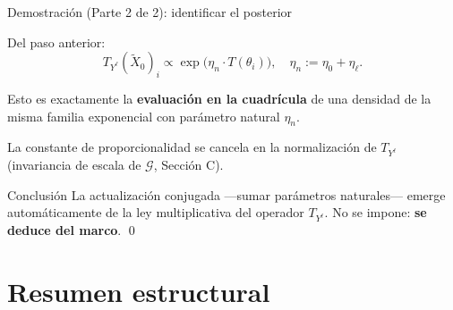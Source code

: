 \documentclass[12pt, aspectratio=169]{beamer}
\begin{document}
\begin{frame}{Demostración (Parte 2 de 2): identificar el posterior}

  Del paso anterior:
  \[
    T_{Y^\ell}(\widetilde X_0)_i
    \propto \exp\bigl(\eta_n \cdot T(\theta_i)\bigr),
    \quad \eta_n := \eta_0 + \eta_\ell.
  \]

  \vspace{6pt}
  Esto es exactamente la \textbf{evaluación en la cuadrícula} de una densidad
  de la misma familia exponencial con parámetro natural $\eta_n$.

  \vspace{6pt}
  La constante de proporcionalidad se cancela en la normalización de $T_{Y^\ell}$
  (invariancia de escala de $\mathcal{G}$, Sección C).

  \vspace{8pt}
  \begin{alertblock}{Conclusión}
    La actualización conjugada ---sumar parámetros naturales--- emerge
    automáticamente de la ley multiplicativa del operador $T_{Y^\ell}$.
    No se impone: \textbf{se deduce del marco}. \qed
  \end{alertblock}
\end{frame}

\section{Resumen estructural}
\end{document}

